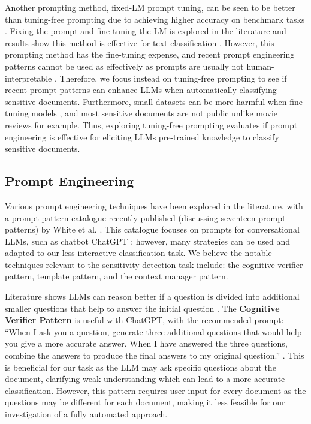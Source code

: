 Another prompting method, fixed-LM prompt tuning, can be seen to be better than tuning-free prompting due to achieving higher accuracy on benchmark tasks \cite{liu2023pre}. Fixing the prompt and fine-tuning the LM is explored in the literature and results show this method is effective for text classification \cite{yin2019benchmarking}. However, this prompting method has the fine-tuning expense, and recent prompt engineering patterns \cite{white2023prompt} cannot be used as effectively as prompts are usually not human-interpretable \cite{liu2023pre}. Therefore, we focus instead on tuning-free prompting to see if recent prompt patterns can enhance LLMs when automatically classifying sensitive documents. Furthermore, small datasets can be more harmful when fine-tuning models \cite{zhao2023survey}, and most sensitive documents are not public unlike movie reviews for example. Thus, exploring tuning-free prompting evaluates if prompt engineering is effective for eliciting LLMs pre-trained knowledge to classify sensitive documents.

\subsection{Prompt Engineering}
\label{sec:background:prompt_engineering}
Various prompt engineering techniques have been explored in the literature, with a prompt pattern catalogue recently published (discussing seventeen prompt patterns) by White et al. \cite{white2023prompt}. This catalogue focuses on prompts for conversational LLMs, such as chatbot ChatGPT \cite{brown2020language}; however, many strategies can be used and adapted to our less interactive classification task. We believe the notable techniques relevant to the sensitivity detection task include: the cognitive verifier pattern, template pattern, and the context manager pattern.

Literature shows LLMs can reason better if a question is divided into additional smaller questions that help to answer the initial question \cite{zhou2022large}. The \textbf{Cognitive Verifier Pattern} is useful with ChatGPT, with the recommended prompt: “When I ask you a question, generate three additional questions that would help you give a more accurate answer. When I have answered the three questions, combine the answers to produce the final answers to my original question.” \cite{white2023prompt}. This is beneficial for our task as the LLM may ask specific questions about the document, clarifying weak understanding which can lead to a more accurate classification. However, this pattern requires user input for every document as the questions may be different for each document, making it less feasible for our investigation of a fully automated approach.

